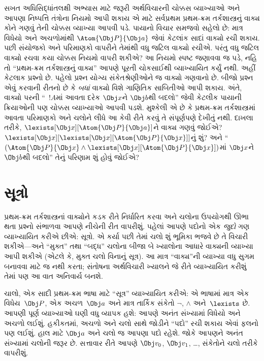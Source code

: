 સખત અધિસિદ્ધાંતલક્ષી અભ્યાસ માટે જરૂરી અર્થવિચારની ચોક્કસ વ્યાખ્યાઓ
અને આપણા નિષ્પત્તિ તંત્રોના નિયમો આપી શકાય એ માટે સર્વપ્રથમ
પ્રથમ-ક્રમ તર્કશાસ્ત્રનું વાક્ય કોને ગણવું તેની ચોક્કસ વ્યાખ્યા
આપવી પડે. પાયાનો વિચાર સમજવો સહેલો છે: માત્ર વિધેયો અને
અચળોમાંથી $\Atom{\Obj P}{\Obj a}$ જેવાં કેટલાંક સાદાં
વાક્યો રચી શકાય. પછી સંયોજકો અને પરિમાણકો વાપરીને તેમાંથી વધુ
જટિલ વાક્યો રચીએ. પરંતુ વધુ જટિલ વાક્યો રચવા કયા ચોક્કસ નિયમો
વાપરી શકીએ? આ નિયમો સ્પષ્ટ જણાવવા જ પડે, નહિ તો ``પ્રથમ-ક્રમ
તર્કશાસ્ત્રનું વાક્ય'' આપણે પૂરતી ચોકસાઈથી વ્યાખ્યાયિત કર્યું
નથી. અહીં કેટલાક પ્રશ્નો છે. પહેલો પ્રશ્ન યોગ્ય સંકેતશ્રેણીઓને જ
વાક્યો ગણવાનો છે. બીજો પ્રશ્ન એવું કરવાની રીતનો છે કે
\emph{બધાં} વાક્યો વિશે ગાણિતિક સાબિતીઓ આપી શકાય. અંતે,
વાક્યો પરની ``~$!A$માં આવતા દરેક $\Obj x$ને $\Obj b$થી બદલો''
જેવી કેટલીક પાયાની ક્રિયાઓની પણ ચોક્કસ વ્યાખ્યાઓ આપવી પડશે. મુશ્કેલી એ
છે કે પ્રથમ-ક્રમ તર્કશાસ્ત્રમાં આવતા પરિમાણકો અને ચલોને લીધે
આ કેવી રીતે કરવું તે સંપૂર્ણપણે દેખીતું નથી. દાખલા તરીકે,
$\lexists[\Obj x][\Atom{\Obj P}{\Obj a}]$ને વાક્ય ગણવું જોઈએ?
$\lexists[\Obj x][\lexists[\Obj x][\Atom{\Obj P}{\Obj x}]]$નું શું?
અને ``$(\Atom{\Obj P}{\Obj x} \land \lexists[\Obj x][\Atom{\Obj
P}{\Obj x}])$માં $\Obj x$ને $\Obj b$થી બદલો'' તેનું પરિણામ શું હોવું
જોઈએ?
\endgroup


\begingroup
\makeatletter{}\makeatother


\section{સૂત્રો}
\label{guunit:OLP-0142}


પ્રથમ-ક્રમ તર્કશાસ્ત્રનાં વાક્યોને કડક રીતે નિર્ધારિત કરવા અને
ચલોના ઉપયોગથી ઊભા થતા પ્રશ્નો સંભાળવા આપણે નીચેની રીત
વાપરીશું. પહેલાં આપણે પદોનો એક \emph{જુદો} ગણ વ્યાખ્યાયિત કરીએ છીએ:
સૂત્રો. એ કર્યા પછી તેમાં ચલો શું ભૂમિકા ભજવે છે તે
વિચારી શકીએ---અને ``મુક્ત'' તથા ``બદ્ધ'' ચલોના બીજા બે
ખ્યાલોના આધારે વાક્યની વ્યાખ્યા આપી શકીએ (એટલે કે, મુક્ત
ચલો વિનાનું સૂત્ર). આ માત્ર ``વાક્ય''ની
વ્યાખ્યા વધુ સુગમ બનાવવા માટે જ નથી કરતા; સંતોષના અર્થવિચારી ખ્યાલને
જે રીતે વ્યાખ્યાયિત કરીશું તેમાં પણ આ વાત અનિવાર્ય બનશે.

ચાલો, એક સાદી પ્રથમ-ક્રમ ભાષા માટે ``સૂત્ર'' વ્યાખ્યાયિત કરીએ:
એ ભાષામાં માત્ર એક વિધેય~$\Obj P$, એક અચળ~$\Obj a$
અને માત્ર તાર્કિક સંકેતો $\lnot$, $\land$ અને~$\lexists$ છે. આપણી
પૂર્ણ વ્યાખ્યાઓ ઘણી વધુ વ્યાપક હશે: આપણે અનંત સંખ્યામાં વિધેયો
અને અચળો લઈશું. હકીકતમાં, અચળો અને ચલો
સાથે જોડીને ``પદો'' રચી શકાય એવાં ફલનો પણ લઈશું. હાલ માટે
$\Obj a$ અને ચલો જ આપણા પદો રહેશે. જોકે આપણને અનંત સંખ્યામાં
ચલોની જરૂર છે. સત્તાવાર રીતે આપણે $\Obj v_0$, $\Obj v_1$,
\dots, સંકેતોને ચલો તરીકે વાપરીશું.

